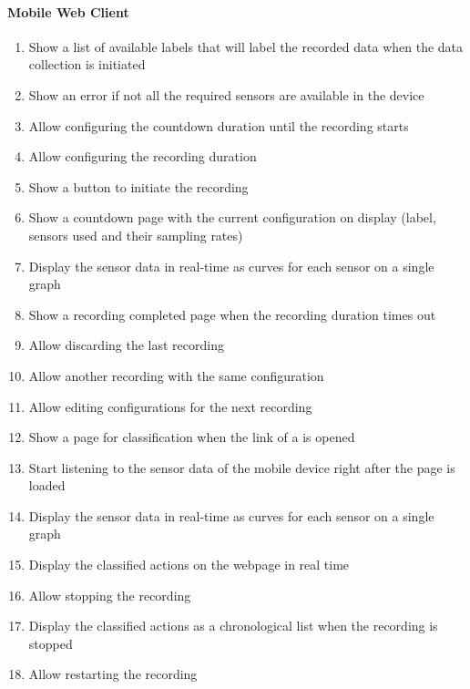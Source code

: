 \paragraph{Mobile Web Client}
\begin{enumerate}[resume*]
    \item \label{itm:conf-rec-label}Show a list of available labels that will \gls{label} the recorded data when the data collection is initiated
    \item \label{itm:conf-rec-nosensor}Show an error if not all the required \glspl{sensor} are available in the device
    \item \label{itm:conf-rec-count}Allow configuring the countdown duration until the recording starts
    \item \label{itm:conf-rec-dur}Allow configuring the recording duration
    \item \label{itm:init-rec-button}Show a button to initiate the recording
    \item \label{itm:init-rec-countdown}Show a countdown page with the current configuration on display (label, \glspl{sensor} used and their sampling rates)
    \item \label{itm:init-rec-realtime}Display the \gls{sensor} data in real-time as curves for each \gls{sensor} on a single graph
    \item \label{itm:init-rec-completed}Show a recording completed page when the recording duration times out
    \item \label{itm:discard-record}Allow discarding the last recording
    \item \label{itm:next-record1}Allow another recording with the same configuration
    \item \label{itm:next-record2}Allow editing configurations for the next recording
    \item \label{itm:show-classification}Show a page for \gls{classification} when the link of a  is opened
    \item \label{itm:start-listening}Start listening to the \gls{sensor} data of the mobile device right after the page is loaded
    \item \label{itm:display-sensor}Display the \gls{sensor} data in real-time as curves for each \gls{sensor} on a single graph
    \item \label{itm:diplay-classified}Display the classified actions on the webpage in real time
    \item \label{itm:stop-recording}Allow stopping the recording
    \item \label{itm:display-recording-chrono}Display the classified actions as a chronological list when the recording is stopped
    \item \label{itm:restart-recording}Allow restarting the recording
\end{enumerate}


